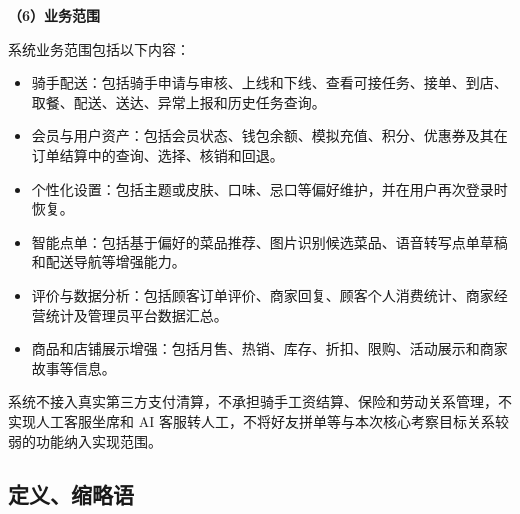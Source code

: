 \textbf{（6）业务范围}

系统业务范围包括以下内容：

\begin{itemize}
\item 骑手配送：包括骑手申请与审核、上线和下线、查看可接任务、接单、到店、取餐、配送、送达、异常上报和历史任务查询。
\item 会员与用户资产：包括会员状态、钱包余额、模拟充值、积分、优惠券及其在订单结算中的查询、选择、核销和回退。
\item 个性化设置：包括主题或皮肤、口味、忌口等偏好维护，并在用户再次登录时恢复。
\item 智能点单：包括基于偏好的菜品推荐、图片识别候选菜品、语音转写点单草稿和配送导航等增强能力。
\item 评价与数据分析：包括顾客订单评价、商家回复、顾客个人消费统计、商家经营统计及管理员平台数据汇总。
\item 商品和店铺展示增强：包括月售、热销、库存、折扣、限购、活动展示和商家故事等信息。
\end{itemize}

系统不接入真实第三方支付清算，不承担骑手工资结算、保险和劳动关系管理，不实现人工客服坐席和 AI 客服转人工，不将好友拼单等与本次核心考察目标关系较弱的功能纳入实现范围。

\subsection{定义、缩略语}

